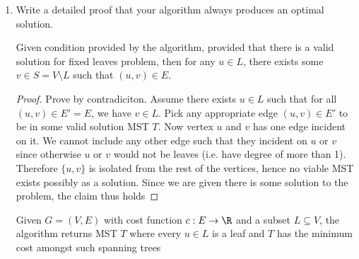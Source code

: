 \documentclass[11pt]{article}
\begin{document}
\begin{enumerate}
    \item Write a detailed proof that your algorithm always produces an optimal solution.


    \begin{lemma*}
        Given condition provided by the algorithm, provided that there is a valid solution for fixed leaves problem, then for any $u\in L$, there exists some $v\in S = V\setminus L$ such that $(u,v) \in E$. 
        \begin{proof}
            Prove by contradiciton. Assume there exists $u\in L$ such that for all $(u,v)\in E'= E$, we have $v\in L$. Pick any appropriate edge $(u,v)\in E'$ to be in some valid solution MST $T$. Now vertex $u$ and $v$ has one edge incident on it. We cannot include any other edge such that they incident on $u$ or $v$ since otherwise $u$ or $v$ would not be leaves (i.e. have degree of more than 1). Therefore $\{ u,v\}$ is isolated from the rest of the vertices, hence no viable MST exists possibly as a solution. Since we are given there is some solution to the problem, the claim thus holds
        \end{proof}
        
    \end{lemma*}



    \begin{proposition*}
        Given $G = (V,E)$ with cost function $c: E\to\R$ and a subset $L\subseteq V$, the algorithm returns MST $T$ where every $u\in L$ is a leaf and $T$ has the minimum cost amongst such spanning trees


\end{proposition*}
\end{enumerate}
\end{document}
